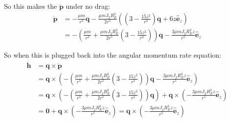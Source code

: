 \documentclass[titlepage]{article}
\begin{document}
So this makes the $\dot{\boldsymbol{p}}$ under no drag:
\begin{equation}
	\begin{split}
		\dot{\boldsymbol{p}}&=-\frac{\mu m}{r^3}\boldsymbol{q}-\frac{\mu mJ_2R_E^2}{2r^5}\left(\left(3-\frac{15z^2}{r^2}\right)\boldsymbol{q}+6z\hat{\boldsymbol{e}}_z\right) \\
		&=-\left(\frac{\mu m}{r^3}+\frac{\mu mJ_2R_E^2}{2r^5}\left(3-\frac{15z^2}{r^2}\right)\right)\boldsymbol{q}-\frac{3\mu mJ_2R_E^2z}{r^5}\hat{\boldsymbol{e}}_z
	\end{split}
\end{equation}

So when this is plugged back into the angular momentum rate equation:
\begin{equation}
	\begin{split}
		\dot{\boldsymbol{h}}&=\boldsymbol{q}\times\dot{\boldsymbol{p}} \\
		&=\boldsymbol{q}\times\left(-\left(\frac{\mu m}{r^3}+\frac{\mu mJ_2R_E^2}{2r^5}\left(3-\frac{15z^2}{r^2}\right)\right)\boldsymbol{q}-\frac{3\mu mJ_2R_E^2z}{r^5}\hat{\boldsymbol{e}}_z\right) \\
		&=\boldsymbol{q}\times\left(-\left(\frac{\mu m}{r^3}+\frac{\mu mJ_2R_E^2}{2r^5}\left(3-\frac{15z^2}{r^2}\right)\right)\boldsymbol{q}\right)+\boldsymbol{q}\times\left(-\frac{3\mu mJ_2R_E^2z}{r^5}\hat{\boldsymbol{e}}_z\right) \\
		&=\boldsymbol{0}+\boldsymbol{q}\times\left(-\frac{3\mu mJ_2R_E^2z}{r^5}\hat{\boldsymbol{e}}_z\right)=\boldsymbol{q}\times\left(-\frac{3\mu mJ_2R_E^2z}{r^5}\hat{\boldsymbol{e}}_z\right)
	\end{split}
\end{equation}
\end{document}
